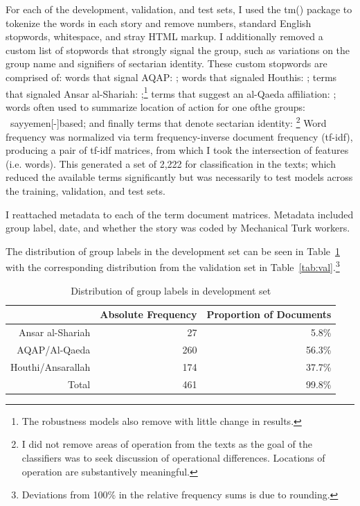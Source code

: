 For each of the development, validation, and test sets, I used the tm() package to tokenize the words in each story and remove numbers, standard English stopwords, whitespace, and stray HTML markup. I additionally removed a custom list of stopwords that strongly signal the group, such as variations on the group name and signifiers of sectarian identity. These custom stopwords are comprised of: words that signal AQAP:   ;
words that signaled Houthis:     ; terms that signaled Ansar al-Shariah:   ;\footnote{The robustness models also remove  with little change in results.} terms that suggest an al-Qaeda affiliation: ; words often used to summarize location of action for one ofthe groups:   \ say{yemen[-]based}; and finally terms that denote sectarian identity: \footnote{I did not
remove areas of operation from the texts as the goal of the
classifiers was to seek discussion of operational differences.
Locations of operation are substantively meaningful.}
Word frequency was normalized via term frequency-inverse document frequency (tf-idf), producing a pair
of tf-idf matrices, from which I took the intersection of features
(i.e. words). This generated a set of 2,222  for classification in the texts; which reduced the available terms significantly but was necessarily to test models across the training, validation, and test sets.

I reattached metadata to each of the term document matrices. Metadata included group label, date, and whether the
story was coded by Mechanical Turk workers.

The distribution of group labels in the development set can be seen in Table~\ref{tab:dev} with the corresponding distribution from the validation set in Table~\ref{tab:val}.\footnote{Deviations from 100\%
  in the relative frequency sums is due to rounding.}

 \begin{table}
 \centering
 \begin{tabular}{rrr}
   \hline
  & Absolute Frequency & Proportion of Documents \\
   \hline
 Ansar al-Shariah &  27  & 5.8\% \\
   AQAP/Al-Qaeda & 260  & 56.3\%\\
   Houthi/Ansarallah & 174 & 37.7\% \\
   Total & 461 & 99.8\% \\
    \hline
 \end{tabular}
 \caption{Distribution of group labels in development set}
 \label{tab:dev}
 \end{table}

